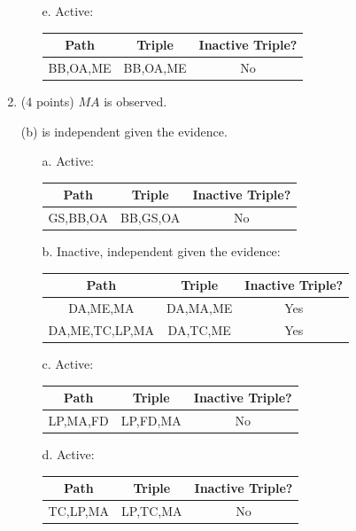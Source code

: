\documentclass[12pt]{article}
\begin{document}
\begin{enumerate}
\begin{enumerate}
		\item[e.]
		Active:
		\begin{center}
			\begin{tabular}{|c|c|c|}
				\hline
				Path & Triple & Inactive Triple? \\
				\hline
				BB,OA,ME & BB,OA,ME & No \\
				\hline
			\end{tabular}
		\end{center}
	
	\end{enumerate}


	\item (4 points) $MA$ is observed.

	(b) is independent given the evidence.

	\begin{enumerate}
		\item[a.]
		Active:
		\begin{center}
			\begin{tabular}{|c|c|c|}
				\hline
				Path & Triple & Inactive Triple? \\
				\hline
				GS,BB,OA & BB,GS,OA & No \\
				\hline
			\end{tabular}
		\end{center}

		\item[b.]
		Inactive, independent given the evidence:
		\begin{center}
			\begin{tabular}{|c|c|c|}
				\hline
				Path & Triple & Inactive Triple? \\
				\hline
				DA,ME,MA & DA,MA,ME & Yes \\
				\hline
				DA,ME,TC,LP,MA & DA,TC,ME & Yes \\
				\hline
			\end{tabular}
		\end{center}

		\item[c.]
		Active:
		\begin{center}
			\begin{tabular}{|c|c|c|}
				\hline
				Path & Triple & Inactive Triple? \\
				\hline
				LP,MA,FD & LP,FD,MA & No \\
				\hline
			\end{tabular}
		\end{center}

		\item[d.]
		Active:
		\begin{center}
			\begin{tabular}{|c|c|c|}
				\hline
				Path & Triple & Inactive Triple? \\
				\hline
				TC,LP,MA & LP,TC,MA & No \\
				\hline
			\end{tabular}
		\end{center}


\end{enumerate}
\end{enumerate}
\end{document}
